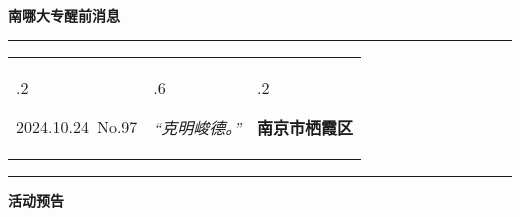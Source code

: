 \documentclass[letterpaper, 12pt]{article}
\begin{document}
\begin{center}
    \Huge\textbf{南哪大专醒前消息}
\end{center}
\vspace{4mm}
\hrule
\renewcommand\tabularxcolumn[1]{m{#1}}
\begin{tabularx}{\textwidth}{>{\hsize.2\hsize}X>{\hsize.6\hsize}X>{\hsize.2\hsize}X}
    \begin{flushleft}
        2024.10.24\, No.97
    \end{flushleft}
    &
    \begin{center}
        \textit{“克明峻德。”}
    \end{center}
    &
    \begin{flushright}
        \textbf{南京市栖霞区}
    \end{flushright}
\end{tabularx}
\vspace{-3.5mm}
\hrule
\vspace{4mm}
\centerline{\huge\textbf{活动预告}}
\end{document}
